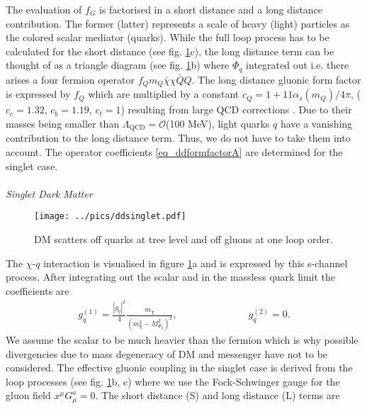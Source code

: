 \noindent The evaluation of $f_G$ is factorised in a short distance and a long distance 
contribution. The former (latter) represents a scale of heavy (light) particles as the colored scalar mediator (quarks). 
While the full loop process has to be calculated for the short distance (see fig. \ref{pic_ddsinglet}c), the long distance term can be thought of
as a triangle diagram (see fig. \ref{pic_ddsinglet}b) where $\Phi_q$ integrated 
out i.e. there arises a four fermion operator $f_Q m_Q \bar \chi \chi\bar Q Q$. The long distance gluonic form factor is expressed by $f_Q$ 
which are multiplied by a constant 
$c_Q = 1+11\alpha_s(m_Q)/4\pi$, ($c_c=1.32$, $c_b = 1.19$, $c_t = 1$)
resulting from large QCD corrections \cite{Djouadi}.
Due to their masses being smaller than $\Lambda_\text{QCD} = \mathcal{O}$(100 MeV), light quarks $q$ have a vanishing contribution to the long
distance term. Thus, we do not have to take them into account. The operator coefficients \eqref{eq_ddformfactorA} are determined for the 
singlet case.
\\ \\ \textit{Singlet Dark Matter}\\
\begin{figure}[t]
 \texttt{[image: ../pics/ddsinglet.pdf]}
 \caption{DM scatters off quarks at tree level and off gluons at one loop order.}
 \label{pic_ddsinglet}
\end{figure}
\noindent The $\chi$-$q$ interaction is visualised in figure \ref{pic_ddsinglet}a and is expressed by this s-channel process. After integrating out 
the scalar and in the massless quark limit the coefficients are
\begin{align}
 g_q^{(1)} = \frac{|g_q|^2 }{4} \frac{m_\chi}{\left(m_\chi^2 - M_{\Phi_q}^2\right)^2},\hspace{3cm} g_q^{(2)} = 0.
\end{align}
We assume the scalar to be much heavier than the fermion which is why possible divergencies due to mass degeneracy of DM and messenger have not
to be considered. 
The effective gluonic coupling in the 
singlet case is derived from the loop processes (see fig. \ref{pic_ddsinglet}b, c) 
where we use the Fock-Schwinger gauge for the gluon
field $x^\mu G^a_\mu = 0$. The short distance (S) and long distance (L) terms are
